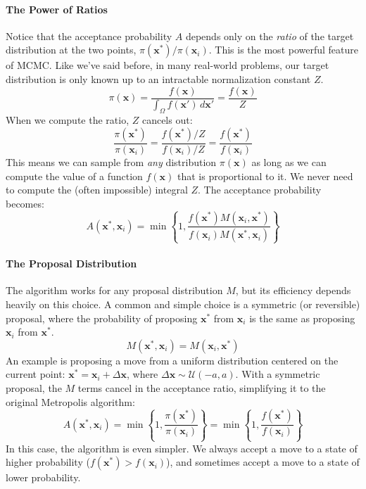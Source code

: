 \paragraph*{The Power of Ratios}
Notice that the acceptance probability $A$ depends only on the \emph{ratio} of the target distribution at the two points, $\pi(\mathbf{x}^*) / \pi(\mathbf{x}_i)$. This is the most powerful feature of MCMC. Like we've said before, in many real-world problems, our target distribution is only known up to an intractable normalization constant $Z$.
\begin{equation}
    \pi(\mathbf{x}) = \frac{f(\mathbf{x})}{\int_{\Omega} f(\mathbf{x}') \, d\mathbf{x}'} = \frac{f(\mathbf{x})}{Z}
\end{equation}
When we compute the ratio, $Z$ cancels out:
\begin{equation}
    \frac{\pi(\mathbf{x}^*)}{\pi(\mathbf{x}_i)} = \frac{f(\mathbf{x}^*)/Z}{f(\mathbf{x}_i)/Z} = \frac{f(\mathbf{x}^*)}{f(\mathbf{x}_i)}
\end{equation}
This means we can sample from \emph{any} distribution $\pi(\mathbf{x})$ as long as we can compute the value of a function $f(\mathbf{x})$ that is proportional to it. We never need to compute the (often impossible) integral $Z$.
The acceptance probability becomes:
\begin{equation}
    A(\mathbf{x}^*, \mathbf{x}_i) = \min \left\{ 1, \frac{f(\mathbf{x}^*) M(\mathbf{x}_i, \mathbf{x}^*)}{f(\mathbf{x}_i) M(\mathbf{x}^*, \mathbf{x}_i)} \right\}
\end{equation}

\paragraph*{The Proposal Distribution}
The algorithm works for any proposal distribution $M$, but its efficiency depends heavily on this choice. A common and simple choice is a symmetric (or reversible) proposal, where the probability of proposing $\mathbf{x}^*$ from $\mathbf{x}_i$ is the same as proposing $\mathbf{x}_i$ from $\mathbf{x}^*$.
\begin{equation}
    M(\mathbf{x}^*, \mathbf{x}_i) = M(\mathbf{x}_i, \mathbf{x}^*)
\end{equation}
An example is proposing a move from a uniform distribution centered on the current point: $\mathbf{x}^* = \mathbf{x}_i + \Delta\mathbf{x}$, where $\Delta\mathbf{x} \sim \mathcal{U}(-a, a)$.
With a symmetric proposal, the $M$ terms cancel in the acceptance ratio, simplifying it to the original Metropolis algorithm:
\begin{equation}
    A(\mathbf{x}^*, \mathbf{x}_i) = \min \left\{ 1, \frac{\pi(\mathbf{x}^*)}{\pi(\mathbf{x}_i)} \right\} = \min \left\{ 1, \frac{f(\mathbf{x}^*)}{f(\mathbf{x}_i)} \right\}
\end{equation}
In this case, the algorithm is even simpler. We always accept a move to a state of higher probability ($f(\mathbf{x}^*) > f(\mathbf{x}_i)$), and sometimes accept a move to a state of lower probability.

